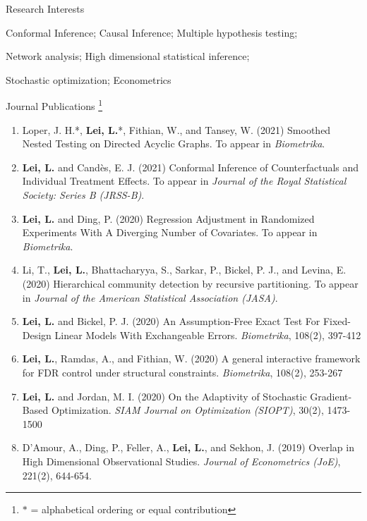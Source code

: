 \documentclass{article}
\begin{document}
\begin{large}
\noindent Research Interests
\end{large}

\vspace{3mm}
Conformal Inference; Causal Inference; Multiple hypothesis testing;

Network analysis; High dimensional statistical inference; 

Stochastic optimization; Econometrics

\vspace{3mm}

\begin{large}
\noindent Journal Publications \footnote{$\ast$ = alphabetical ordering or equal contribution}
\end{large}

\begin{enumerate}
\item Loper, J. H.*, \textbf{Lei, L.}*, Fithian, W., and Tansey, W. (2021) Smoothed Nested Testing on Directed Acyclic Graphs. To appear in \emph{Biometrika}.
\item \textbf{Lei, L.} and Cand\`{e}s, E. J. (2021) Conformal Inference of Counterfactuals and Individual Treatment Effects. To appear in \emph{Journal of the Royal Statistical Society: Series B (JRSS-B)}.
\item \textbf{Lei, L.} and Ding, P. (2020) Regression Adjustment in Randomized Experiments With A Diverging Number of Covariates. To appear in \emph{Biometrika}.
\item Li, T., \textbf{Lei, L.}, Bhattacharyya, S., Sarkar, P., Bickel, P. J., and Levina, E. (2020) Hierarchical community detection by recursive partitioning. To appear in \emph{Journal of the American Statistical Association (JASA)}.
\item \textbf{Lei, L.} and Bickel, P. J. (2020) An Assumption-Free Exact Test For Fixed-Design Linear Models With Exchangeable Errors. \emph{Biometrika}, 108(2), 397-412
\item \textbf{Lei, L.}, Ramdas, A., and Fithian, W. (2020) A general interactive framework for FDR control under structural constraints. \emph{Biometrika}, 108(2), 253-267
\item \textbf{Lei, L.} and Jordan, M. I. (2020) On the Adaptivity of Stochastic Gradient-Based Optimization. \emph{SIAM Journal on Optimization (SIOPT)}, 30(2), 1473-1500
\item D'Amour, A., Ding, P., Feller, A., \textbf{Lei, L.}, and Sekhon, J. (2019) Overlap in High Dimensional Observational Studies. \emph{Journal of Econometrics (JoE)}, 221(2), 644-654.

\end{enumerate}
\end{document}
